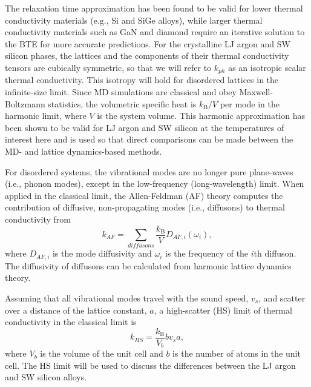 \documentclass[12pt,twocolumn,iop]{/usr/share/texmf-texlive/tex/latex/iop/iopart}[/usr/share/texmf-texlive/tex/latex/iop/]
\begin{document}
The relaxation time approximation has been found to be valid  
for lower thermal conductivity materials 
(e.g., Si and SiGe alloys),
\cite{broido_intrinsic_2007,ward_intrinsic_2010,garg_role_2011} 
while larger thermal conductivity 
materials such as GaN and diamond require an  
iterative solution to the BTE for more accurate predictions.
\cite{ward_ab_2009,lindsay_thermal_2012} 
For the crystalline LJ argon and SW silicon phases, 
the lattices and the components of their 
thermal conductivity tensors are cubically symmetric, 
so that we will refer to 
$k_{ph}$ as an isotropic scalar thermal conductivity. 
This isotropy will hold for disordered lattices 
in the infinite-size limit. 
Since MD simulations are classical 
and obey Maxwell-Boltzmann 
statistics,\cite{mcquarrie_statistical_2000} the volumetric 
specific heat is $k_{\text{B}}/V$ per mode in the harmonic limit, where $V$ 
is the system volume. This harmonic approximation has been shown to be valid 
for LJ argon and SW silicon at the temperatures of interest here
\cite{mcgaughey_quantitative_2004,goicochea_thermal_2010} 
and is used so that direct comparisons can be made between 
the MD- and lattice dynamics-based methods.

For disordered systems, the vibrational modes are no 
longer pure plane-waves (i.e., phonon modes), except in the low-frequency 
(long-wavelength) limit. When applied in the classical limit, 
the Allen-Feldman (AF) theory computes 
the contribution of diffusive, non-propagating modes (i.e., diffusons) 
to thermal conductivity from\cite{allen_thermal_1993} 
\begin{equation}\label{EQ:M:k_AF}
k_{AF} = \sum_{diffusons} \frac{k_{\text{B}}}{V} D_{AF,i}(\omega_i),
\end{equation}
where $D_{AF,i}$ is the mode diffusivity and $\omega_i$ is the 
frequency of the $i$th diffuson. The diffusivity of diffusons 
can be calculated from harmonic lattice dynamics theory.
\cite{allen_thermal_1993,feldman_thermal_1993,feldman_numerical_1999} 

Assuming that all vibrational modes travel with the sound speed, $v_s$, and 
scatter over a distance of the lattice constant, $a$, 
a high-scatter (HS) limit of thermal conductivity in the classical 
limit is\cite{cahill_lattice_1988} 
\begin{equation}\label{EQ:M:k_AF,HS}
k_{HS} = \frac{k_{\text{B}}}{V_b}b v_s a,
\end{equation}
where $V_b$ is the volume of the unit cell and $b$ is the number of atoms 
in the unit cell. The HS limit will be used to 
discuss the differences between the LJ argon and SW silicon alloys. 
\end{document}
